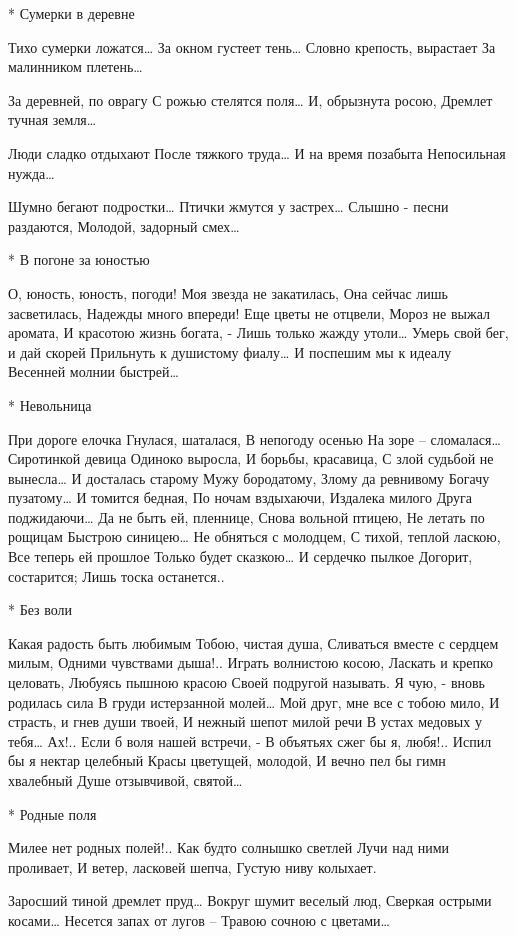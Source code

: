 * Сумерки в деревне

Тихо сумерки ложатся…
За окном густеет тень…
Словно крепость, вырастает
За малинником плетень…

За деревней, по оврагу
С рожью стелятся поля…
И, обрызнута росою,
Дремлет тучная земля…

Люди сладко отдыхают
После тяжкого труда…
И на время позабыта
Непосильная нужда…

Шумно бегают подростки…
Птички жмутся у застрех…
Слышно - песни раздаются,
Молодой, задорный смех…


* В погоне за юностью

О, юность, юность, погоди!
Моя звезда не закатилась,
Она сейчас лишь засветилась,
Надежды много впереди!
Еще цветы не отцвели,
Мороз не выжал аромата,
И красотою жизнь богата, -
Лишь только жажду утоли…
Умерь свой бег, и дай скорей
Прильнуть к душистому фиалу…
И поспешим мы к идеалу
Весенней молнии быстрей…


* Невольница

При дороге елочка
Гнулася, шаталася,
В непогоду осенью
На зоре – сломалася…
Сиротинкой девица
Одиноко выросла,
И борьбы, красавица,
С злой судьбой не вынесла…
И досталась старому
Мужу бородатому,
Злому да ревнивому
Богачу пузатому…
И томится бедная,
По ночам вздыхаючи,
Издалека милого
Друга поджидаючи…
Да не быть ей, пленнице,
Снова вольной птицею,
Не летать по рощицам
Быстрою синицею…
Не обняться с молодцем,
С тихой, теплой ласкою,
Все теперь ей прошлое
Только будет сказкою…
И сердечко пылкое
Догорит, состарится;
Лишь тоска останется..


* Без воли

Какая радость быть любимым
Тобою, чистая душа,
Сливаться вместе с сердцем милым,
Одними чувствами дыша!..
Играть волнистою косою,
Ласкать и крепко целовать,
Любуясь пышною красою
Своей подругой называть.
Я чую, - вновь родилась сила
В груди истерзанной молей…
Мой друг, мне все с тобою мило,
И страсть, и гнев души твоей,
И нежный шепот милой речи
В устах медовых у тебя…
Ах!.. Если б воля нашей встречи, -
В объятьях сжег бы я, любя!..
Испил бы я нектар целебный
Красы цветущей, молодой,
И вечно пел бы гимн хвалебный
Душе отзывчивой, святой…


* Родные поля

Милее нет родных полей!..
Как будто солнышко светлей
Лучи над ними проливает,
И ветер, ласковей шепча,
Густую ниву колыхает.

Заросший тиной дремлет пруд…
Вокруг шумит веселый люд,
Сверкая острыми косами…
Несется запах от лугов –
Травою сочною с цветами…

